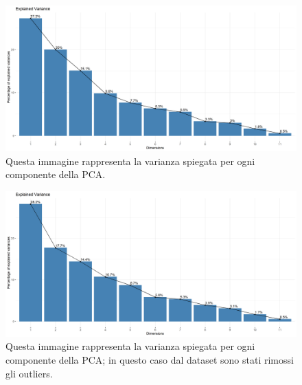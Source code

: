 \newpage

\begin{figure}[H]
    \centering
    \includegraphics[scale=.4]{images/analisi/pca/variance_O.png}
    \caption{Questa immagine rappresenta la varianza spiegata per ogni componente della PCA.}
    \label{fig:variance_O}
\end{figure}

\begin{figure}[H]
    \centering
    \includegraphics[scale=.4]{images/analisi/pca/variance_NoO.png}
    \caption{Questa immagine rappresenta la varianza spiegata per ogni componente della PCA; in questo caso dal dataset sono stati rimossi gli outliers.}
    \label{fig:variance_NoO}
\end{figure}
